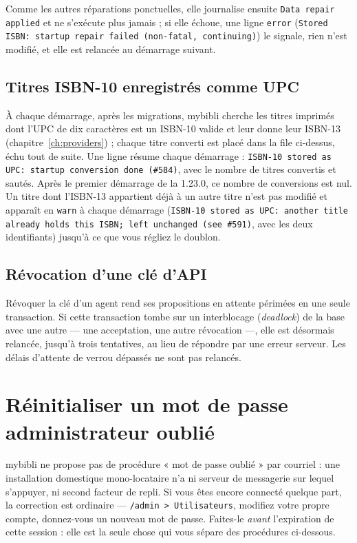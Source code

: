 \noindent Comme les autres réparations ponctuelles, elle journalise
ensuite \texttt{Data repair applied} et ne s'exécute plus jamais ; si
elle échoue, une ligne \texttt{error} (\texttt{Stored ISBN: startup
repair failed (non-fatal, continuing)}) le signale, rien n'est modifié,
et elle est relancée au démarrage suivant.

\subsection*{Titres ISBN-10 enregistrés comme UPC}

À chaque démarrage, après les migrations, mybibli cherche les titres
imprimés dont l'UPC de dix caractères est un ISBN-10 valide et leur
donne leur ISBN-13 (chapitre~\ref{ch:providers}) ; chaque titre converti
est placé dans la file ci-dessus, échu tout de suite. Une ligne résume
chaque démarrage : \texttt{ISBN-10 stored as UPC: startup conversion
done (\#584)}, avec le nombre de titres convertis et sautés. Après le
premier démarrage de la 1.23.0, ce nombre de conversions est nul. Un
titre dont l'ISBN-13 appartient déjà à un autre titre n'est pas modifié
et apparaît en \texttt{warn} à chaque démarrage (\texttt{ISBN-10 stored
as UPC: another title already holds this ISBN; left unchanged (see \#591)}, avec
les deux identifiants) jusqu'à ce que vous régliez le doublon.

\subsection*{Révocation d'une clé d'API}

Révoquer la clé d'un agent rend ses propositions en attente périmées en
une seule transaction. Si cette transaction tombe sur un interblocage
(\emph{deadlock}) de la base avec une autre --- une acceptation, une
autre révocation ---, elle est désormais relancée, jusqu'à trois
tentatives, au lieu de répondre par une erreur serveur. Les délais
d'attente de verrou dépassés ne sont pas relancés.

\section{Réinitialiser un mot de passe administrateur oublié}\label{sec:reset-admin-password}

mybibli ne propose pas de procédure « mot de passe oublié » par
courriel : une installation domestique mono-locataire n'a ni serveur de
messagerie sur lequel s'appuyer, ni second facteur de repli. Si vous
êtes encore connecté quelque part, la correction est ordinaire —
\texttt{/admin > Utilisateurs}, modifiez votre propre compte, donnez-vous
un nouveau mot de passe. Faites-le \emph{avant} l'expiration de cette
session : elle est la seule chose qui vous sépare des procédures
ci-dessous.

